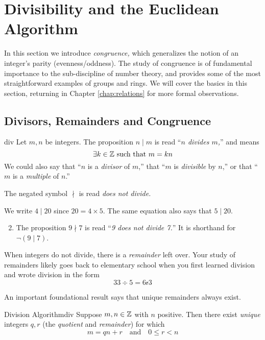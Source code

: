 \section{Divisibility and the Euclidean Algorithm}\label{chap:gcd}

\def\divides{\mid}
\def\ndivides{\nmid}

In this section we introduce \emph{congruence,} which generalizes the notion of an integer's parity (evenness/oddness). The study of congruence is of fundamental importance to the sub-discipline of number theory, and provides some of the most straightforward examples of groups and rings. We will cover the basics in this section, returning in Chapter \ref{chap:relations} for more formal observations.


\subsection{Divisors, Remainders and Congruence}\label{sec:cong}


\begin{defn}{}{div}
	Let $m,n$ be integers. The proposition $n\mid m$ is read ``\emph{$n$ divides $m$,}'' and means
	\[
		\exists k\in\mathbb{Z}\text{ such that }m=kn
	\]
	We could also say that ``$n$ is a \emph{divisor} of $m$,'' that ``$m$ is \emph{divisible} by $n$,'' or that ``$m$ is a \emph{multiple} of $n$.''
\end{defn}

The negated symbol $\ndivides$ is read \emph{does not divide.}

\begin{examples}{}{}
	\exstart We write $4\divides 20$ since $20=4\times 5$. The same equation also says that $5\mid 20$.
	\begin{enumerate}\setcounter{enumi}{1}
		\item The proposition $9\ndivides 7$ is read ``\emph{9 does not divide 7.}'' It is shorthand for $\neg(9\mid 7)$.
	\end{enumerate}
\end{examples}

When integers do not divide, there is a \emph{remainder} left over. Your study of remainders likely goes back to elementary school when you first learned division and wrote division in the form 
\[
	33\div 5=6\mathbin{\mathsf r}3 \tag{read ``6 remainder 3''}
\]

An important foundational result says that unique remainders always exist.


\begin{thm}{Division Algorithm\footnotemark}{div}
	Suppose $m,n\in\mathbb{Z}$ with $n$ positive. Then there exist \emph{unique} integers $q,r$ (the \emph{quotient} and \emph{remainder}) for which
	\[
		m=qn+r\quad\text{and}\quad 0\le r<n
	\]
\end{thm}


